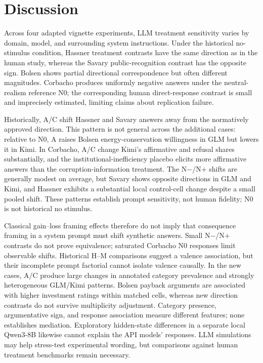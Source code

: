 \documentclass[14pt,a4paper]{extarticle}
\begin{document}
\section{Discussion}

Across four adapted vignette experiments, LLM treatment sensitivity varies by domain, model, and surrounding system instructions. Under the historical no-stimulus condition, Hassner treatment contrasts have the same direction as in the human study, whereas the Savary public-recognition contrast has the opposite sign. Bolsen shows partial directional correspondence but often different magnitudes. Corbacho produces uniformly negative answers under the neutral-realism reference N0; the corresponding human direct-response contrast is small and imprecisely estimated, limiting claims about replication failure.

Historically, A/C shift Hassner and Savary answers away from the normatively approved direction. This pattern is not general across the additional cases: relative to N0, A raises Bolsen energy-conservation willingness in GLM but lowers it in Kimi. In Corbacho, A/C change Kimi's affirmative and refusal shares substantially, and the institutional-inefficiency placebo elicits more affirmative answers than the corruption-information treatment. The N$-$/N$+$ shifts are generally modest on average, but Savary shows opposite directions in GLM and Kimi, and Hassner exhibits a substantial local control-cell change despite a small pooled shift. These patterns establish prompt sensitivity, not human fidelity; N0 is not historical no stimulus.

Classical gain--loss framing effects therefore do not imply that consequence framing in a system prompt must shift synthetic answers. Small N$-$/N$+$ contrasts do not prove equivalence; saturated Corbacho N0 responses limit observable shifts. Historical H--M comparisons suggest a valence association, but their incomplete prompt factorial cannot isolate valence causally. In the new cases, A/C produce large changes in annotated category prevalence and strongly heterogeneous GLM/Kimi patterns. Bolsen payback arguments are associated with higher investment ratings within matched cells, whereas new direction contrasts do not survive multiplicity adjustment. Category presence, argumentative sign, and response association measure different features; none establishes mediation. Exploratory hidden-state differences in a separate local Qwen3-8B likewise cannot explain the API models' responses. LLM simulations may help stress-test experimental wording, but comparisons against human treatment benchmarks remain necessary.
\end{document}
